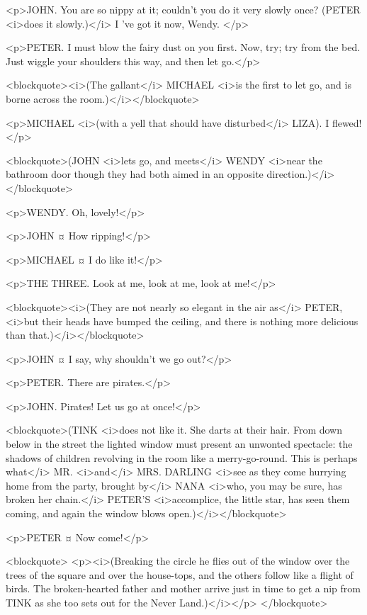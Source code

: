 <p>JOHN. You are so nippy at it; couldn't you do it very slowly once? (PETER <i>does it slowly.)</i> I 've got it now, Wendy.
</p>

<p>PETER. I must blow the fairy dust on you first.
Now, try; try from the bed. Just wiggle your shoulders this way, and then let go.</p>

<blockquote><i>(The gallant</i> MICHAEL <i>is the first to let go, and is borne across the room.)</i></blockquote>

<p>MICHAEL <i>(with a yell that should have disturbed</i> LIZA). I flewed!</p>

<blockquote>(JOHN <i>lets go, and meets</i> WENDY <i>near the bathroom door though they had both aimed in an opposite direction.)</i></blockquote>

<p>WENDY. Oh, lovely!</p>

<p>JOHN ¤
How ripping!</p>

<p>MICHAEL ¤
I do like it!</p>

<p>THE THREE. Look at me, look at me, look at me!</p>

<blockquote><i>(They are not nearly so elegant in the air as</i> PETER, <i>but their heads have bumped the ceiling, and there is nothing more delicious than that.)</i></blockquote>

<p>JOHN ¤
I say, why shouldn't we go out?</p>

<p>PETER. There are pirates.</p>

<p>JOHN. Pirates!
Let us go at once!</p>

<blockquote>(TINK <i>does not like it. She darts at their hair. From down below in the street the lighted window must present an unwonted spectacle: the shadows of children revolving in the room like a merry-go-round. This is perhaps what</i> MR. <i>and</i> MRS. DARLING <i>see as they come hurrying home from the party, brought by</i> NANA <i>who, you may be sure, has broken her chain.</i> PETER'S <i>accomplice, the little star, has seen them coming, and again the window blows open.)</i></blockquote>

<p>PETER ¤
Now come!</p>

<blockquote> <p><i>(Breaking the circle he flies out of the window over the trees of the square and over the house-tops, and the others follow like a flight of birds. The broken-hearted father and mother arrive just in time to get a nip from TINK as she too sets out for the Never Land.)</i></p> </blockquote>

